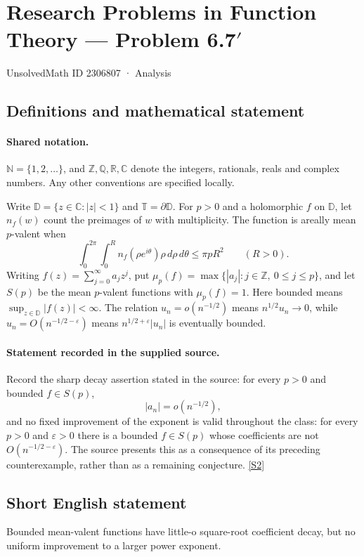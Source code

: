 \documentclass[11pt]{article}
\newcommand{\sref}[2]{\hyperlink{source:#1:#2}{[S#2]}}
\begin{document}
\setcounter{section}{2306806}
\section{Research Problems in Function Theory — Problem 6.7$\prime$}\label{2306807}
{\small\sffamily UnsolvedMath ID 2306807 · Analysis}
\subsection{Definitions and mathematical statement}

\paragraph{Shared notation.}$\mathbb N=\{1,2,\ldots\}$, and $\mathbb Z,\mathbb Q,\mathbb R,\mathbb C$ denote the integers, rationals, reals and complex numbers. Any other conventions are specified locally.


Write $\mathbb D=\{z\in\mathbb C:|z|<1\}$ and $\mathbb T=\partial\mathbb D$. For $p>0$ and a holomorphic $f$ on $\mathbb D$, let $n_f(w)$ count the preimages of $w$ with multiplicity. The function is areally mean $p$-valent when
\[\int_0^{2\pi}\int_0^R n_f(\rho e^{i\theta})\rho\,d\rho\,d\theta\leq\pi pR^2\qquad(R>0).\]
Writing $f(z)=\sum_{j=0}^{\infty}a_jz^j$, put $\mu_p(f)=\max\{|a_j|:j\in\mathbb Z,\ 0\leq j\leq p\}$, and let $S(p)$ be the mean $p$-valent functions with $\mu_p(f)=1$.
Here bounded means $\sup_{z\in\mathbb D}|f(z)|<\infty$. The relation $u_n=o(n^{-1/2})$ means $n^{1/2}u_n\to0$, while $u_n=O(n^{-1/2-\varepsilon})$ means $n^{1/2+\varepsilon}|u_n|$ is eventually bounded.
\paragraph{Statement recorded in the supplied source.}
Record the sharp decay assertion stated in the source: for every $p>0$ and bounded $f\in S(p)$,
\[|a_n|=o(n^{-1/2}),\]
and no fixed improvement of the exponent is valid throughout the class: for every $p>0$ and $\varepsilon>0$ there is a bounded $f\in S(p)$ whose coefficients are not $O(n^{-1/2-\varepsilon})$. The source presents this as a consequence of its preceding counterexample, rather than as a remaining conjecture. \sref{2306807}{2}
\subsection{Short English statement}
Bounded mean-valent functions have little-o square-root coefficient decay, but no uniform improvement to a larger power exponent.
\end{document}
